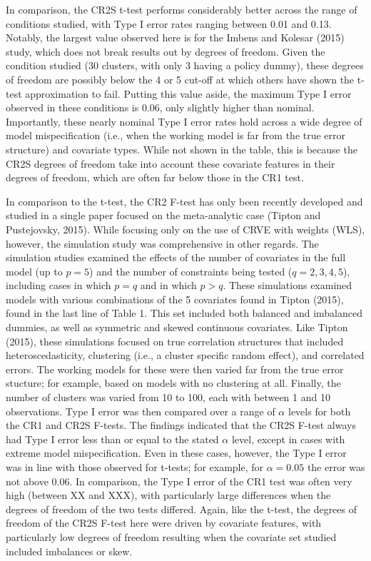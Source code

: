 \documentclass[12pt]{article}\usepackage[]{graphicx}\usepackage[]{color}
\begin{document}
In comparison, the CR2S t-test performs considerably better across the range of conditions studied, with Type I error rates ranging between 0.01 and 0.13.
Notably, the largest value observed here is for the Imbens and Kolesar (2015) study, which does not break results out by degrees of freedom. 
Given the condition studied (30 clusters, with only 3 having a policy dummy), these degrees of freedom are possibly below the 4 or 5 cut-off at which others have shown the t-test approximation to fail. 
Putting this value aside, the maximum Type I error observed in these conditions is 0.06, only slightly higher than nominal.
Importantly, these nearly nominal Type I error rates hold across a wide degree of model mispecification (i.e., when the working model is far from the true error structure) and covariate types.
While not shown in the table, this is because the CR2S degrees of freedom take into account these covariate features in their degrees of freedom, which are often far below those in the CR1 test.


In comparison to the t-test, the CR2 F-test has only been recently developed and studied in a single paper focused on the meta-analytic case (Tipton and Pustejovsky, 2015).
While focusing only on the use of CRVE with weights (WLS), however, the simulation study was comprehensive in other regards.
The simulation studies examined the effects of the number of covariates in the full model (up to $p = 5$) and the number of constraints being tested ($q = 2,3,4,5$), including cases in which $p = q$ and in which $p > q$. 
These simulations examined models with various combinations of the 5 covariates found in Tipton (2015), found in the last line of Table 1. 
This set included both balanced and imbalanced dummies, as well as symmetric and skewed continuous covariates.
Like Tipton (2015), these simulations focused on true correlation structures that included heteroscedasticity, clustering (i.e., a cluster specific random effect), and correlated errors.
The working models for these were then varied far from the true error stucture; for example, based on models with no clustering at all.
Finally, the number of clusters was varied from 10 to 100, each with between 1 and 10 observations. 
Type I error was then compared over a range of $\alpha$ levels for both the CR1 and CR2S F-tests.
The findings indicated that the CR2S F-test always had Type I error less than or equal to the stated $\alpha$ level, except in cases with extreme model mispecification. 
Even in these cases, however, the Type I error was in line with those observed for t-tests; for example, for $\alpha = 0.05$ the error was not above 0.06. 
In comparison, the Type I error of the CR1 test was often very high (between XX and XXX), with particularly large differences when the degrees of freedom of the two tests differed.
Again, like the t-test, the degrees of freedom of the CR2S F-test here were driven by covariate features, with particularly low degrees of freedom resulting when the covariate set studied included imbalances or skew.
\end{document}
